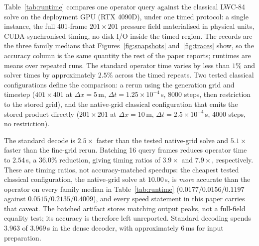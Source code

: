 \documentclass[11pt,a4paper]{article}
\begin{document}
Table~\ref{tab:runtime} compares one operator query against the classical LWC-84 solve on
the deployment GPU (RTX 4090D), under one timed protocol: a single instance, the full
401-frame $201\times201$ pressure field materialised in physical units, CUDA-synchronised
timing, no disk I/O inside the timed region. The records are the three family medians that
Figures~\ref{fig:snapshots} and~\ref{fig:traces} show, so the accuracy column is the same
quantity the rest of the paper reports; runtimes are means over repeated runs. The standard operator time varies by less than
$1\%$ and solver times by approximately $2.5\%$ across the timed repeats. Two tested classical configurations define the
comparison: a rerun using the generation grid and timestep ($401\times401$ at $\Delta x=5$\,m,
$\Delta t=1.25\times10^{-4}$\,s, 8000 steps, then restriction to the stored grid), and the
native-grid classical configuration that emits the stored product directly ($201\times201$ at
$\Delta x=10$\,m, $\Delta t=2.5\times10^{-4}$\,s, 4000 steps, no restriction).

\begin{table}[t]
\centering
\caption{Runtime and accuracy, single instance on the same GPU, family-median records,
train split. Accuracy is relative $L^2$ over the future window against the stored truth.
$^a$~includes velocity-resampling discrepancy (see text). $^b$~16-frame decoding has
matching output peaks, but full-field equivalence and accuracy were not independently checked.}
\label{tab:runtime}
\end{table}

The standard decode is $2.5\times$ faster than the tested native-grid solve and $5.1\times$
faster than the fine-grid rerun. Batching 16 query frames reduces operator time to $2.54$\,s,
a $36.0\%$ reduction, giving timing ratios of $3.9\times$ and $7.9\times$, respectively.
These are timing ratios, not accuracy-matched speedups: the cheapest tested classical
configuration, the native-grid solve at $10.00$\,s, is \emph{more} accurate than the operator
on every family median in Table~\ref{tab:runtime} ($0.0177/0.0156/0.1197$ against
$0.0515/0.2135/0.4009$), and every speed statement in this paper carries that caveat.
The batched artifact stores matching output peaks, not a full-field equality test; its
accuracy is therefore left unreported. Standard decoding spends $3.963$ of $3.969$\,s in the
dense decoder, with approximately $6$\,ms for input preparation.
\end{document}
